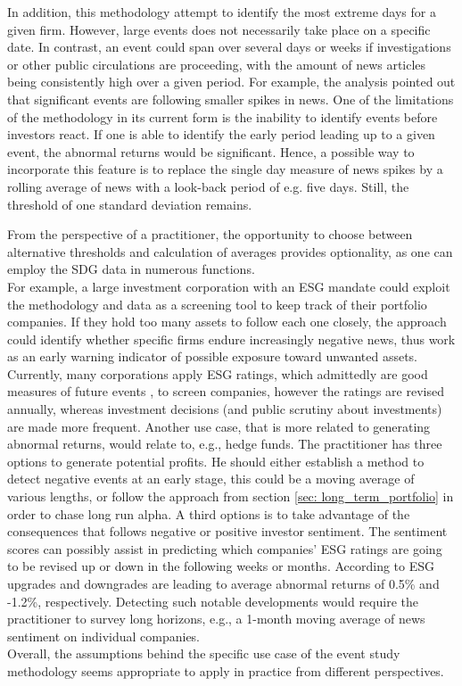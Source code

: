 In addition, this methodology attempt to identify the most extreme days for a given firm. However, large events does not necessarily take place on a specific date. In contrast, an event could span over several days or weeks if investigations or other public circulations are proceeding, with the amount of news articles being consistently high over a given period. For example, the analysis pointed out that significant events are following smaller spikes in news. One of the limitations of the methodology in its current form is the inability to identify events before investors react. If one is able to identify the early period leading up to a given event, the  abnormal returns would be significant. Hence, a possible way to incorporate this feature is to replace the single day measure of news spikes by a rolling average of news with a look-back period of e.g. five days. Still, the threshold of one standard deviation remains. 

From the perspective of a practitioner, the opportunity to choose between alternative thresholds and calculation of averages provides optionality, as one can employ the SDG data in numerous functions. \\
For example, a large investment corporation with an ESG mandate could exploit the methodology and data as a screening tool to keep track of their portfolio companies. If they hold too many assets to follow each one closely, the approach could identify whether specific firms endure increasingly negative news, thus work as an early warning indicator of possible exposure toward unwanted assets. Currently, many corporations apply ESG ratings, which admittedly are good measures of future events \citep{serafeim2022stock}, to screen companies, however the ratings are revised annually, whereas investment decisions (and public scrutiny about investments) are made more frequent. Another use case, that is more related to generating abnormal returns, would relate to, e.g., hedge funds. The practitioner has three options to generate potential profits. He should either establish a method to detect negative events at an early stage, this could be a moving average of various lengths, or follow the approach from section \ref{sec: long_term_portfolio} in order to chase long run alpha. A third options is to take advantage of the consequences that follows negative or positive investor sentiment. The sentiment scores can possibly assist in predicting which companies' ESG ratings are going to be revised up or down in the following weeks or months. According to \cite{ESG_ratings_change} ESG upgrades and downgrades are leading to average abnormal returns of 0.5\% and -1.2\%, respectively. Detecting such notable developments would require the practitioner to survey long horizons, e.g., a 1-month moving average of news sentiment on individual companies. \\
Overall, the assumptions behind the specific use case of the event study methodology seems appropriate to apply in practice from different perspectives. 

